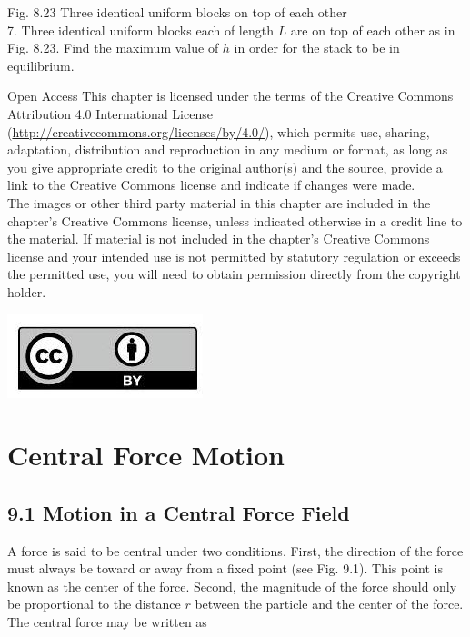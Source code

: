 \documentclass[10pt]{article}
\begin{document}
Fig. 8.23 Three identical uniform blocks on top of each other\\
7. Three identical uniform blocks each of length $L$ are on top of each other as in Fig. 8.23. Find the maximum value of $h$ in order for the stack to be in equilibrium.

Open Access This chapter is licensed under the terms of the Creative Commons Attribution 4.0 International License (\href{http://creativecommons.org/licenses/by/4.0/}{http://creativecommons.org/licenses/by/4.0/}), which permits use, sharing, adaptation, distribution and reproduction in any medium or format, as long as you give appropriate credit to the original author(s) and the source, provide a link to the Creative Commons license and indicate if changes were made.\\
The images or other third party material in this chapter are included in the chapter's Creative Commons license, unless indicated otherwise in a credit line to the material. If material is not included in the chapter's Creative Commons license and your intended use is not permitted by statutory regulation or exceeds the permitted use, you will need to obtain permission directly from the copyright holder.

\begin{center}
\includegraphics[max width=\textwidth]{2024_09_13_db1f357d2aad0a03eb2eg-141(1)}
\end{center}

\section*{Central Force Motion}
\subsection*{9.1 Motion in a Central Force Field}
A force is said to be central under two conditions. First, the direction of the force must always be toward or away from a fixed point (see Fig. 9.1). This point is known as the center of the force. Second, the magnitude of the force should only be proportional to the distance $r$ between the particle and the center of the force. The central force may be written as
\end{document}
